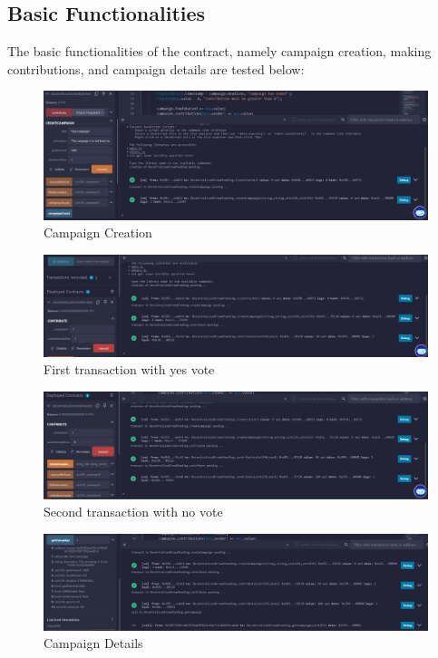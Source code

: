 \documentclass[12pt,reqno]{article}
\begin{document}
\subsection{Basic Functionalities}

The basic functionalities of the contract, namely campaign creation, 
making contributions, and campaign details are tested below: 

\begin{figure}[h!]
    \centering
    \includegraphics[width=0.6\linewidth]{Pictures/camp_create.png}
    \caption{Campaign Creation}
    \label{camp_create}
\end{figure}

\begin{figure}[h!]
    \centering
    \includegraphics[width=0.6\linewidth]{Pictures/first_transaction.png}
    \caption{First transaction with yes vote}
    \label{first_transaction}
\end{figure}

\begin{figure}[h!]
    \centering
    \includegraphics[width=0.6\linewidth]{Pictures/second_transaction.png}
    \caption{Second transaction with no vote}
    \label{second_transaction}
\end{figure}

\begin{figure}[!ht]
    \centering
    \includegraphics[width=0.6\linewidth]{Pictures/campaign_details.png}
    \caption{Campaign Details}
    \label{details}
\end{figure}
\end{document}
